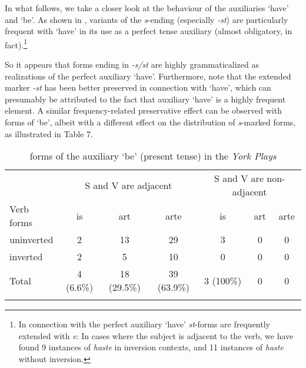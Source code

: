 \documentclass[output=paper]{langsci/langscibook}
\begin{document}
In what follows, we take a closer look at the behaviour of the auxiliaries
`have' and `be'. As shown in , variants of the
\emph{s}-ending (especially \emph{-st}) are particularly frequent with `have’
in its use as a perfect tense auxiliary (almost obligatory, in
fact).\footnote{In connection with the perfect auxiliary ‘have'
    \Ssg{} \emph{st}-forms are frequently extended with \emph{e}: In cases
    where the subject is adjacent to the verb, we have found 9 instances of
\emph{haste} in inversion contexts, and 11 instances of \emph{haste} without
inversion.}

\begin{table}
\caption{Verbal endings of the second person perfect auxiliary `have' in the \emph{York Plays}\label{table1-2ndps-have}}
\end{table}

So it appears that forms ending in \emph{-s/st} are highly grammaticalized as
realizations of the \Ssg{} perfect auxiliary `have'. Furthermore, note that the
extended \Ssg{} marker \emph{-st} has been better preserved in connection
with `have', which can presumably be attributed to the fact that auxiliary
`have' is a highly frequent element. A similar frequency-related preservative
effect can be observed with \Ssg{} forms of `be', albeit with a different
effect on the distribution of \emph{s}-marked forms, as illustrated in Table
7.

\begin{table}
  \begin{tabular}{lcccccc}
  \lsptoprule
& \multicolumn{3}{c}{S and V are adjacent} & \multicolumn{3}{c}{S and V are non-adjacent}\\\cmidrule(lr){2-4}\cmidrule(lr){5-7}
Verb forms  & is & art & arte & is & art & arte\\
uninverted & 2 & 13 & 29 & 3 & 0 & 0\\
inverted & 2 & 5 & 10 & 0  & 0 & 0\\\midrule
Total & 4 (6.6\%) & 18 (29.5\%) & 39 (63.9\%) & 3 (100\%) & 0 & 0\\
  \lspbottomrule
  \end{tabular}
\caption{\Ssg{} forms of the auxiliary `be' (present tense) in the \emph{York
Plays}\label{table1-2ndps-be}}
\end{table}
\end{document}
